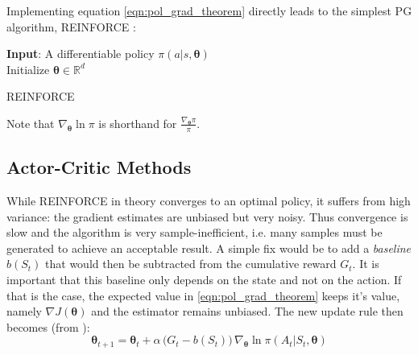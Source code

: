 
Implementing equation \ref{eqn:pol_grad_theorem} directly leads to the simplest PG algorithm, REINFORCE \cite{williams1992reinforce}:

\begin{algorithm}[H]
\SetAlgoLined
\textbf{Input}: A differentiable policy $\pi(a|s, \bm{\theta})$\\
Initialize $\bm{\theta} \in \mathbb{R}^d$\\
 \caption{REINFORCE}
 \label{algo:reinforce}
\end{algorithm}

Note that $\nabla_{\bm{\theta}} \ln \pi$ is shorthand for $\frac{\nabla_{\bm{\theta}} \pi}{ \pi}$.
\subsection{Actor-Critic Methods}
\label{sec:actor_critic}
While REINFORCE in theory converges to an optimal policy, it suffers from high variance: the gradient estimates are unbiased but very noisy. Thus convergence is slow and the algorithm is very sample-inefficient, i.e. many samples must be generated to achieve an acceptable result. A simple fix would be to add a \emph{baseline} $b(S_t)$ that would then be subtracted from the cumulative reward $G_t$. It is important that this baseline only depends on the state and not on the action. If that is the case, the expected value in \ref{eqn:pol_grad_theorem} keeps it's value, namely $\nabla J(\bm{\theta})$ and the estimator remains unbiased. The new update rule then becomes (from \cite{sutton2018reinforcement}):
\begin{equation}
    \label{eqn:pg_update}
    \bm{\theta}_{t+1} = \bm{\theta}_{t} + \alpha \,\big ( G_t - b(S_t) \big) \, \nabla_{\bm{\theta}} \ln \pi(A_t|S_t,\bm{\theta})
\end{equation}

